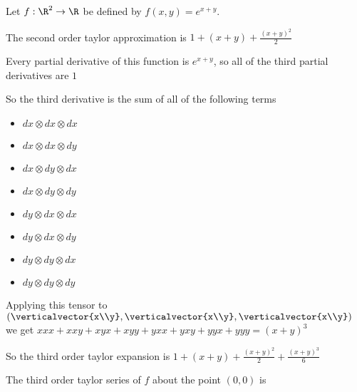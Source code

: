 \documentclass{ximera}
\begin{document}
\begin{question}
  Let $f:\R^2 \to \R$ be defined by $f(x,y) = e^{x+y}$.  
  \begin{solution}
    \begin{hint}
      The second order taylor approximation is $1+(x+y)+\frac{(x+y)^2}{2}$
    \end{hint}
    \begin{hint}
      Every partial derivative of this function is $e^{x+y}$, so all of the third partial derivatives are $1$
    \end{hint}
    \begin{hint}
      So the third derivative is the sum of all of the following terms 
      \begin{itemize}
      \item $dx \otimes dx \otimes dx$
      \item $dx \otimes dx \otimes dy$
      \item $dx \otimes dy \otimes dx$
      \item $dx \otimes dy \otimes dy$
      \item $dy \otimes dx \otimes dx$
      \item $dy \otimes dx \otimes dy$
      \item $dy \otimes dy \otimes dx$
      \item $dy \otimes dy \otimes dy$
      \end{itemize}
    \end{hint}
    \begin{hint}
      Applying this tensor to $(\verticalvector{x\\y},\verticalvector{x\\y},\verticalvector{x\\y})$ we get 
      $xxx+xxy+xyx+xyy+yxx+yxy+yyx+yyy = (x+y)^3$
    \end{hint}
    \begin{hint}
      So the third order taylor expansion is $1+(x+y)+\frac{(x+y)^2}{2}+\frac{(x+y)^3}{6}$
    \end{hint}
    The third order taylor series of $f$ about the point $(0,0)$ is 
  \end{solution}
\end{question}

	
	
\end{document}
